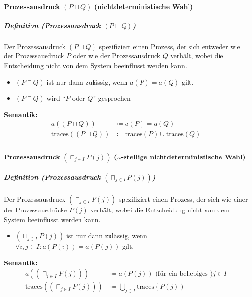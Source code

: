 \documentclass[a4paper, 11pt, accentcolor = tud3b]{tudreport}
\newcommand{\subsubparagraph}[1]{\hspace{1cm} \textbf{#1:}}
\newcommand{\definition}[2]{\subparagraph{Definition (#1)} #2}
\begin{document}
				    \paragraph{Prozessausdruck $ (P \sqcap Q) $ (nichtdeterministische Wahl)}
					    \definition{Prozessausdruck $ (P \sqcap Q) $}{
					    	Der Prozessausdruck $ (P \sqcap Q) $ spezifiziert einen Prozess, der sich entweder wie der Prozessausdruck $ P $ oder wie der Prozessausdruck $ Q $ verhält, wobei die Entscheidung nicht von dem System beeinflusst werden kann.
					    	\begin{itemize}
					    		\item $ (P \sqcap Q) $ ist nur dann zulässig, wenn $ a(P) = a(Q) $ gilt.
					    		\item $ (P \sqcap Q) $ wird \enquote{$ P $ oder $ Q $} gesprochen
					    	\end{itemize}
					    	
					    	\subsubparagraph{Semantik}
						    	\begin{align*}
							    	a((P \sqcap Q)) &\coloneqq a(P) = a(Q) \\
							    	\text{traces}((P \sqcap Q)) &\coloneqq \text{traces}(P) \cup \text{traces}(Q) \\
						    	\end{align*}
					    }
				    
				    \paragraph{Prozessausdruck $ (\sqcap _ { j \in I } P(j)) $ ($ n $-stellige nichtdeterministische Wahl)}
					    \definition{Prozessausdruck $ (\sqcap _ { j \in I } P(j)) $}{
					    	Der Prozessausdruck $ (\sqcap _ { j \in I } P(j)) $ spezifiziert einen Prozess, der sich wie einer der Prozessausdrücke $ P(j) $ verhält, wobei die Entscheidung nicht von dem System beeinflusst werden kann.
					    	\begin{itemize}
					    		\item $ (\sqcap _ { j \in I } P(j)) $ ist nur dann zulässig, wenn $ \forall i, j \in I : a(P(i)) = a(P(j)) $ gilt.
					    	\end{itemize}
					    	
					    	\subsubparagraph{Semantik}
						    	\begin{align*}
							    	a((\sqcap _ { j \in I } P(j))) &\coloneqq a(P(j)) \text{ (für ein beliebiges )} j \in I \\
							    	\text{traces}((\sqcap _ { j \in I } P(j))) &\coloneqq \bigcup _ { j \in I } \text{traces}(P(j)) \\
						    	\end{align*}
					    }
				    
\end{document}
